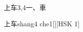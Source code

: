 \begin{entry}{上车}{3,4}{⼀、⾞}
  \begin{phonetics}{上车}{shang4 che1}[][HSK 1]
  \end{phonetics}
\end{entry}
